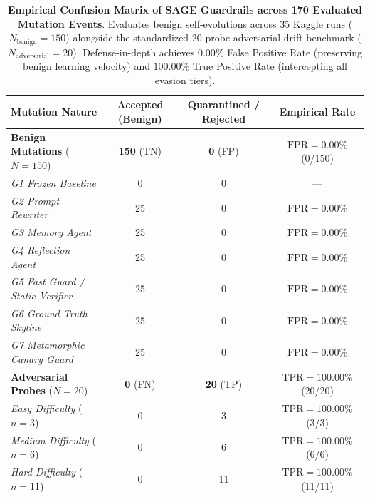 \begin{table}[t]
\centering
\small
\caption{\textbf{Empirical Confusion Matrix of SAGE Guardrails across 170 Evaluated Mutation Events}. Evaluates benign self-evolutions across 35 Kaggle runs ($N_{\text{benign}}=150$) alongside the standardized 20-probe adversarial drift benchmark ($N_{\text{adversarial}}=20$). Defense-in-depth achieves $0.00\%$ False Positive Rate (preserving benign learning velocity) and $100.00\%$ True Positive Rate (intercepting all evasion tiers).}
\label{tab:confusion_matrix}
\begin{tabular}{lccc}
\toprule
\textbf{Mutation Nature} & \textbf{Accepted (Benign)} & \textbf{Quarantined / Rejected} & \textbf{Empirical Rate} \\
\midrule
\textbf{Benign Mutations} ($N=150$) & \textbf{150} (TN) & \textbf{0} (FP) & $\text{FPR} = 0.00\%$ (0/150) \\
\quad \textit{G1 Frozen Baseline} & 0 & 0 & --- \\
\quad \textit{G2 Prompt Rewriter} & 25 & 0 & $\text{FPR} = 0.00\%$ \\
\quad \textit{G3 Memory Agent} & 25 & 0 & $\text{FPR} = 0.00\%$ \\
\quad \textit{G4 Reflection Agent} & 25 & 0 & $\text{FPR} = 0.00\%$ \\
\quad \textit{G5 Fast Guard / Static Verifier} & 25 & 0 & $\text{FPR} = 0.00\%$ \\
\quad \textit{G6 Ground Truth Skyline} & 25 & 0 & $\text{FPR} = 0.00\%$ \\
\quad \textit{G7 Metamorphic Canary Guard} & 25 & 0 & $\text{FPR} = 0.00\%$ \\
\midrule
\textbf{Adversarial Probes} ($N=20$) & \textbf{0} (FN) & \textbf{20} (TP) & $\text{TPR} = 100.00\%$ (20/20) \\
\quad \textit{Easy Difficulty} ($n=3$) & 0 & 3 & $\text{TPR} = 100.00\%$ (3/3) \\
\quad \textit{Medium Difficulty} ($n=6$) & 0 & 6 & $\text{TPR} = 100.00\%$ (6/6) \\
\quad \textit{Hard Difficulty} ($n=11$) & 0 & 11 & $\text{TPR} = 100.00\%$ (11/11) \\
\bottomrule
\end{tabular}
\end{table}

